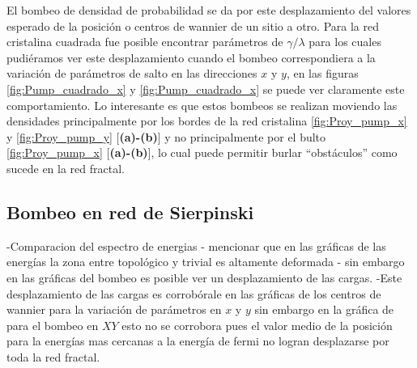 El bombeo de densidad de probabilidad se da por este desplazamiento del valores esperado de la posición o centros de wannier de un sitio a otro. Para la red cristalina cuadrada fue posible encontrar parámetros de $\gamma/\lambda$ para los cuales pudiéramos ver este desplazamiento cuando el bombeo correspondiera a la variación de parámetros de salto en las direcciones $x$ y $y$, en las figuras \ref{fig:Pump_cuadrado_x}  y \ref{fig:Pump_cuadrado_x}  se puede ver claramente este comportamiento. Lo interesante es que estos bombeos se realizan moviendo las densidades principalmente por los bordes de la red cristalina \ref{fig:Proy_pump_x} y \ref{fig:Proy_pump_y} [\textbf{(a)-(b)}] y no principalmente por el bulto \ref{fig:Proy_pump_x}  [\textbf{(a)-(b)}], lo cual puede permitir burlar ``obstáculos'' como sucede en la red fractal.





















\subsection{Bombeo en red de Sierpinski}
-Comparacion del espectro de energias
- mencionar que en las gráficas de las energías la zona entre topológico y trivial es altamente deformada 
- sin embargo en las gráficas del bombeo es posible ver un desplazamiento de las cargas.
-Este desplazamiento de las cargas es corrobórale en las gráficas de los centros de wannier para la variación de parámetros en $x$ y $y$ sin embargo en la gráfica de para el bombeo en $XY$ esto no se corrobora pues el valor medio de la posición para la energías mas cercanas a la energía de fermi no logran desplazarse por toda la red fractal. 


















